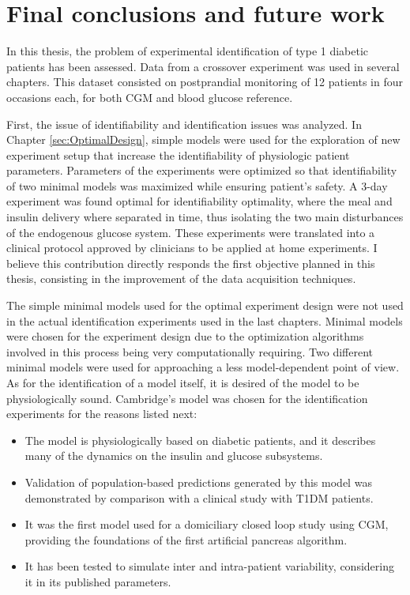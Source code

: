 \chapter{Final conclusions and future work}
\label{sec:future}

In this thesis, the problem of experimental identification of type 1 diabetic patients has been assessed. Data from a crossover experiment was used in several chapters. This dataset consisted on postprandial monitoring of 12 patients in four occasions each, for both CGM and blood glucose reference.

First, the issue of identifiability and identification issues was analyzed. In Chapter \ref{sec:OptimalDesign}, simple models were used for the exploration of new experiment setup that increase the identifiability of physiologic patient parameters. Parameters of the experiments were optimized so that identifiability of two minimal models was maximized while ensuring patient's safety. A 3-day experiment was found optimal for identifiability optimality, where the meal and insulin delivery where separated in time, thus isolating the two main disturbances of the endogenous glucose system. These experiments were translated into a clinical protocol approved by clinicians to be applied at home experiments. I believe this contribution directly responds the first objective planned in this thesis, consisting in the improvement of the data acquisition techniques.

The simple minimal models used for the optimal experiment design were not used in the actual identification experiments used in the last chapters. Minimal models were chosen for the experiment design due to the optimization algorithms involved in this process being very computationally requiring. Two different minimal models were used for approaching a less model-dependent point of view. As for the identification of a model itself, it is desired of the model to be physiologically sound. Cambridge's model \cite{simuladorhovorka} was chosen for the identification experiments for the reasons listed next:
\begin{itemize}
	\item The model is physiologically based on diabetic patients, and it describes many of the dynamics on the insulin and glucose subsystems.
	\item Validation of population-based predictions generated by this model was demonstrated by comparison with a clinical study with T1DM patients.
	\item It was the first model used for a domiciliary closed loop study using CGM, providing the foundations of the first artificial pancreas algorithm.
	\item It has been tested to simulate inter and intra-patient variability, considering it in its published parameters.
\end{itemize}

